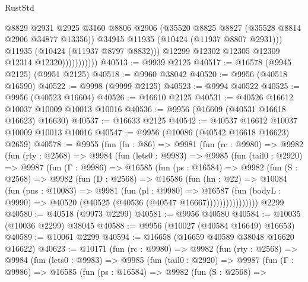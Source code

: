 \begin{lexlean}{RustStd}
\begin{coremodule}
                              @8829
                              @2931
                              @2925
                              @3160
                              @8806
                              @2906
                              (@35520 @8825 @8827 (@35528 @8814 @2906 @34877 @13356))
                              @34915
                              @11935
                              (@10424 (@11937 @8807 @2931)))
                            @11935
                            (@10424 (@11937 @8797 @8832)))
                          @12299
                          @12302
                          @12305
                          @12309
                          @12314
                          @12320)))))))))))
@40513 := @9939 @2125
@40517 := @16578 (@9945 @2125) (@9951 @2125)
@40518 := @9960 @38042
@40520 := @9956 (@40518 @16590)
@40522 := @9998 (@9999 @2125)
@40523 := @9994 @40522
@40525 := @9956 (@40523 @16604)
@40526 := @16610 @2125
@40531 := @40526 @16612 @10037 @10009 @10013 @10016
@40536 := @9956 (@16609 (@40531 @16618 @16623) @16630)
@40537 := @16633 @2125
@40542 := @40537 @16612 @10037 @10009 @10013 @10016
@40547 := @9956 (@10086 (@40542 @16618 @16623) @2659)
@40578 := @9955
    (fun (fn : @86) =>
    @9981
      (fun (rc : @9980) =>
      @9982
        (fun (rty : @2568) =>
        @9984
          (fun (lets0 : @9983) =>
          @9985
            (fun (tail0 : @2920) =>
            @9987
              (fun (Γ : @9986) =>
              @16585
                (fun (ps : @16584) =>
                @9982
                  (fun (S : @2568) =>
                  @9982
                    (fun (D : @2568) =>
                    @16586
                      (fun (hn : @22) =>
                      @10084
                        (fun (pns : @10083) =>
                        @9981
                          (fun (pl : @9980) =>
                          @16587
                            (fun (bodyL : @9990) =>
                            @40520 (@40525 (@40536 (@40547 @16667))))))))))))))))
    @2299
@40580 := @40518 (@9973 @2299)
@40581 := @9956 @40580
@40584 := @10035 (@10036 @2299) @38045
@40588 := @9956 (@10027 (@40584 @16649) @16653)
@40589 := @10061 @2299
@40594 := @16658 (@16659 @40589 @38048 @16620 @16622)
@40623 := @10171
    (fun (rc : @9980) =>
    @9982
      (fun (rty : @2568) =>
      @9984
        (fun (lets0 : @9983) =>
        @9985
          (fun (tail0 : @2920) =>
          @9987
            (fun (Γ : @9986) =>
            @16585
              (fun (ps : @16584) =>
              @9982
                (fun (S : @2568) =>

\end{coremodule}
\end{lexlean}
